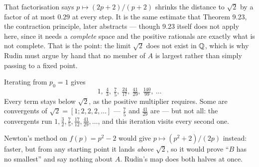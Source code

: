 \begin{center}
\end{center}

\begin{deeper}
That factorisation says $p \mapsto (2p+2)/(p+2)$ shrinks the distance to
$\sqrt2$ by a factor of at most $0.29$ at every step. It is the same estimate
that Theorem 9.23, the contraction principle, later abstracts --- though 9.23
itself does not apply here, since it needs a \emph{complete} space and the
positive rationals are exactly what is not complete. That is the point: the
limit $\sqrt2$ does not exist in $\mathbb{Q}$, which is why Rudin must argue by hand
that no member of $A$ is largest rather than simply passing to a fixed point.

Iterating from $p_0 = 1$ gives
\[ 1,\ \tfrac43,\ \tfrac75,\ \tfrac{24}{17},\ \tfrac{41}{29},\
   \tfrac{140}{99},\ \dots \]
Every term stays below $\sqrt2$, as the positive multiplier requires. Some are
convergents of $\sqrt 2 = [1;2,2,2,\dots]$ --- $\tfrac75$ and $\tfrac{41}{29}$
are --- but not all: the convergents run
$1, \tfrac32, \tfrac75, \tfrac{17}{12}, \tfrac{41}{29}, \dots$, and this
iteration visits every second one.

Newton's method on $f(p) = p^2-2$ would give $p \mapsto (p^2+2)/(2p)$ instead:
faster, but from any starting point it lands \emph{above} $\sqrt2$, so it would
prove ``$B$ has no smallest'' and say nothing about $A$. Rudin's map does both
halves at once.
\end{deeper}

